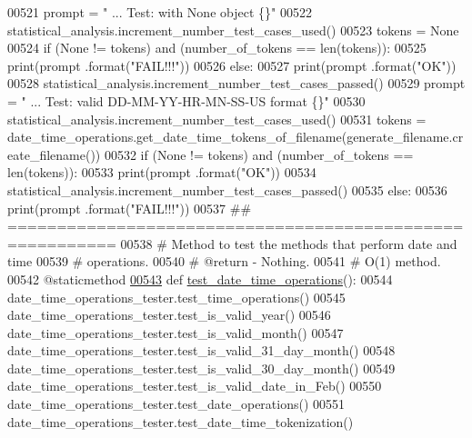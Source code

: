 \begin{DoxyCode}
00521         prompt = \textcolor{stringliteral}{"  ... Test: with None object              \{\}"}
00522         statistical\_analysis.increment\_number\_test\_cases\_used()
00523         tokens = \textcolor{keywordtype}{None}
00524         \textcolor{keywordflow}{if} (\textcolor{keywordtype}{None} != tokens) \textcolor{keywordflow}{and} (number\_of\_tokens == len(tokens)):
00525             print(prompt .format(\textcolor{stringliteral}{"FAIL!!!"}))
00526         \textcolor{keywordflow}{else}:
00527             print(prompt .format(\textcolor{stringliteral}{"OK"}))
00528             statistical\_analysis.increment\_number\_test\_cases\_passed()
00529         prompt = \textcolor{stringliteral}{"  ... Test: valid DD-MM-YY-HR-MN-SS-US format     \{\}"}
00530         statistical\_analysis.increment\_number\_test\_cases\_used()
00531         tokens = date\_time\_operations.get\_date\_time\_tokens\_of\_filename(generate\_filename.create\_filename())
00532         \textcolor{keywordflow}{if} (\textcolor{keywordtype}{None} != tokens) \textcolor{keywordflow}{and} (number\_of\_tokens == len(tokens)):
00533             print(prompt .format(\textcolor{stringliteral}{"OK"}))
00534             statistical\_analysis.increment\_number\_test\_cases\_passed()
00535         \textcolor{keywordflow}{else}:
00536             print(prompt .format(\textcolor{stringliteral}{"FAIL!!!"}))
00537     \textcolor{comment}{## =========================================================}
00538     \textcolor{comment}{#   Method to test the methods that perform date and time}
00539     \textcolor{comment}{#       operations.}
00540     \textcolor{comment}{#   @return - Nothing.}
00541     \textcolor{comment}{#   O(1) method.}
00542     @staticmethod
\hypertarget{date__time__processing__tester_8py_source_l00543}{}\hyperlink{classutilities_1_1date__time__processing__tester_1_1date__time__operations__tester_a6582bc9ede3803192a54abe03c7c0f7e}{00543}     \textcolor{keyword}{def }\hyperlink{classutilities_1_1date__time__processing__tester_1_1date__time__operations__tester_a6582bc9ede3803192a54abe03c7c0f7e}{test\_date\_time\_operations}():
00544         date\_time\_operations\_tester.test\_time\_operations()
00545         date\_time\_operations\_tester.test\_is\_valid\_year()
00546         date\_time\_operations\_tester.test\_is\_valid\_month()
00547         date\_time\_operations\_tester.test\_is\_valid\_31\_day\_month()
00548         date\_time\_operations\_tester.test\_is\_valid\_30\_day\_month()
00549         date\_time\_operations\_tester.test\_is\_valid\_date\_in\_Feb()
00550         date\_time\_operations\_tester.test\_date\_operations()
00551         date\_time\_operations\_tester.test\_date\_time\_tokenization()
\end{DoxyCode}
